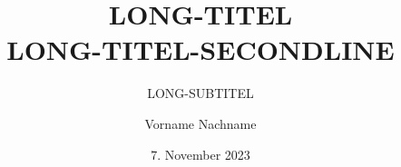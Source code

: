 \title[SHORT-TITLE]{LONG-TITEL\\LONG-TITEL-SECONDLINE}
\subtitle[SHORT-SUBTITEL]{LONG-SUBTITEL} 
\author{Vorname Nachname}
\newcommand{\faculty}{FACULTY}
\newcommand{\university}{HTWK Leipzig}
\newcommand{\universityLong}{Hochschule für Technik, Wirtschaft und Kultur Leipzig}
\date{7. November 2023}





